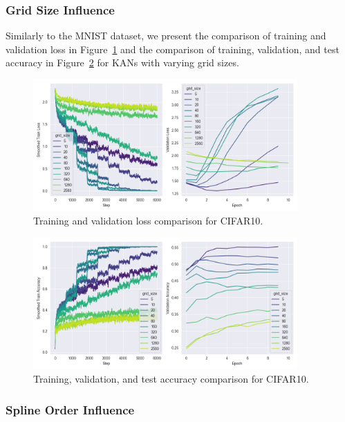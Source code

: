 \documentclass{article}
\begin{document}
\subsubsection{Grid Size Influence}\label{subsubsec:grid-size-influence-cifar10}

Similarly to the MNIST dataset, we present the comparison of training and validation loss in Figure~\ref{fig:cifar10_loss_grid_size}
and the comparison of training, validation, and test accuracy in Figure~\ref{fig:cifar10_accuracy_grid_size} for KANs with varying grid sizes.

\begin{figure}[H]
    \centering
    \includegraphics[width=0.9\textwidth]{pics/cifar10_loss_grid_size}
    \caption{Training and validation loss comparison for CIFAR10.}
    \label{fig:cifar10_loss_grid_size}
\end{figure}

\begin{figure}[H]
    \centering
    \includegraphics[width=0.9\textwidth]{pics/cifar10_accuracy_grid_size}
    \caption{Training, validation, and test accuracy comparison for CIFAR10.}
    \label{fig:cifar10_accuracy_grid_size}
\end{figure}


\subsubsection{Spline Order Influence}\label{subsubsec:spline-order-influence-cifar10}
\end{document}

